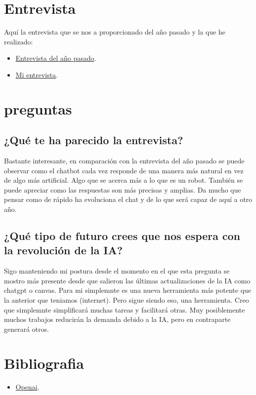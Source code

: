 \documentclass[12pt]{article}
\begin{document}
\section{Entrevista}
Aquí la entrevista que se nos a proporcionado del año pasado y la que he realizado:
\begin{itemize}
    \item \href{https://chatgpt.com/share/907d545d-40e9-4f90-8d3d-d2fbeffab0c5}{Entrevista del año pasado}.
    \item\href{https://chatgpt.com/share/670c71fa-8d74-8010-9bd9-caebf7366706}{Mi entrevista}.
\end{itemize}

\section{preguntas}
\subsection{¿Qué te ha parecido la entrevista?}

Bastante interesante, en comparación con la entrevista del año pasado se puede observar como el chatbot cada vez responde de una manera más natural en vez de algo más artificial. Algo que se acerca más 
a lo que es un robot. También se puede apreciar como las respuestas son más precisas y amplias. Da mucho que pensar como de rápido ha evoluciona el chat y de lo que será capaz de aquí a otro año.

\subsection{¿Qué tipo de futuro crees que nos espera con la revolución de la IA?}

Sigo manteniendo mi postura desde el momento en el que esta pregunta se mostro más presente desde que salieron las últimas actualizaciones de la IA como chatgpt o canvas. Para mi simplemnte es una nueva herramienta
más potente que la anterior que teniamos (internet). Pero sigue siendo eso, una herramienta. Creo que simplemnte simplificará muchas tareas y facilitará otras. Muy posiblemente muchos trabajos reducirán la 
demanda debido a la IA, pero en contraparte generará otros.

\clearpage

\section{Bibliografia}
\begin{itemize}
    \item \href{https://openai.com/index/chatgpt/}{Openai}.
\end{itemize}
\end{document}
